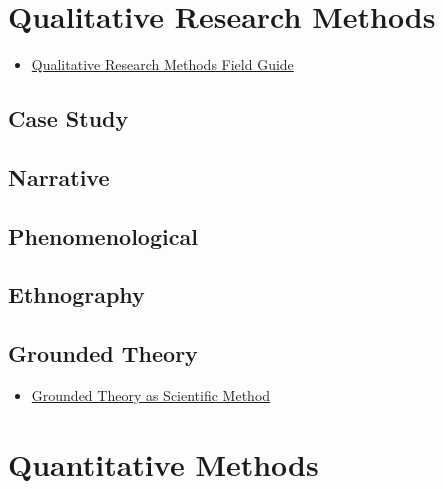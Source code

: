 \documentclass[]{book}
\providecommand{\tightlist}{%
  \setlength{\itemsep}{0pt}\setlength{\parskip}{0pt}}
\begin{document}
\hypertarget{qualmethods}{%
\chapter{Qualitative Research Methods}\label{qualmethods}}

\begin{itemize}
\tightlist
\item
  \href{https://course.ccs.neu.edu/is4800sp12/resources/qualmethods.pdf}{Qualitative Research Methods Field Guide}
\end{itemize}

\hypertarget{case-study-1}{%
\section{Case Study}\label{case-study-1}}

\hypertarget{narrative}{%
\section{Narrative}\label{narrative}}

\hypertarget{phenomenological}{%
\section{Phenomenological}\label{phenomenological}}

\hypertarget{ethnography}{%
\section{Ethnography}\label{ethnography}}

\hypertarget{grounded-theory}{%
\section{Grounded Theory}\label{grounded-theory}}

\begin{itemize}
\tightlist
\item
  \href{https://pdfs.semanticscholar.org/5886/43f9ded159acc42daeefed6f1d1952bea546.pdf}{Grounded Theory as Scientific Method}
\end{itemize}

\hypertarget{quantitative-methods}{%
\chapter{Quantitative Methods}\label{quantitative-methods}}
\end{document}
